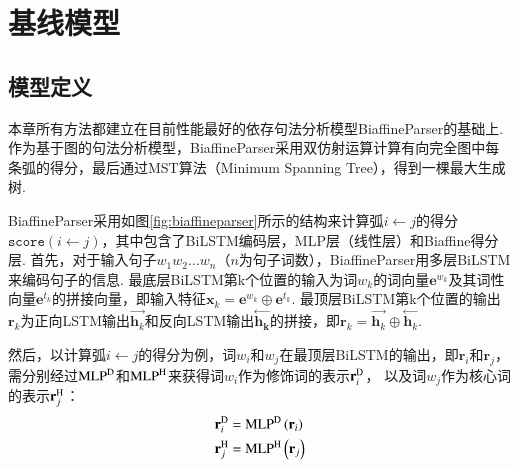 \section{基线模型}

\subsection{模型定义}
本章所有方法都建立在目前性能最好的依存句法分析模型BiaffineParser的基础上.
作为基于图的句法分析模型，BiaffineParser采用双仿射运算计算有向完全图中每条弧的得分，最后通过MST算法（Minimum Spanning Tree），得到一棵最大生成树.

BiaffineParser采用如图\ref{fig:biaffineparser}所示的结构来计算弧$i \leftarrow j$的得分$\texttt{score}\left( i \leftarrow j \right)$，其中包含了BiLSTM编码层，MLP层（线性层）和Biaffine得分层.
首先，对于输入句子$w_1w_2\dots w_n$（$n$为句子词数），BiaffineParser用多层BiLSTM来编码句子的信息.
最底层BiLSTM第k个位置的输入为词$w_k$的词向量$\mathbf{e}^{w_k}$及其词性向量$\mathbf{e}^{t_k}$的拼接向量，即输入特征$\mathbf{x}_k=\mathbf{e}^{w_k} \oplus \mathbf{e}^{t_k}$. %
最顶层BiLSTM第k个位置的输出$\mathbf{r}_k$为正向LSTM输出$\stackrel{\rightarrow}{\mathbf{h}_k}$和反向LSTM输出$\stackrel{\leftarrow}{\mathbf{h_k}}$的拼接，即$\mathbf{r}_k=\stackrel{\rightarrow}{\mathbf{h}_k} \oplus \stackrel{\leftarrow}{\mathbf{h}_k}$.

然后，以计算弧$i \leftarrow j$的得分为例，词$w_i$和$w_j$在最顶层BiLSTM的输出，即$\mathbf{r}_i$和$\mathbf{r}_j$，
需分别经过$\textup{MLP}^\textup{D}$和$\textup{MLP}^\textup{H}$来获得词$w_i$作为修饰词的表示$\mathbf{r}_i^\textup{D}$，
以及词$w_j$作为核心词的表示$\mathbf{r}_j^\textup{H}$：
\begin{equation}\label{eq:mlp}
    \begin{split}
        \mathbf{r}_{i}^{\textup{D}} &= \textup{MLP}^\textup{D} \left(\mathbf{r}_i \right) \\
        \mathbf{r}_{j}^{\textup{H}} &= \textup{MLP}^\textup{H} \left(\mathbf{r}_j \right) \\
    \end{split}
\end{equation}

